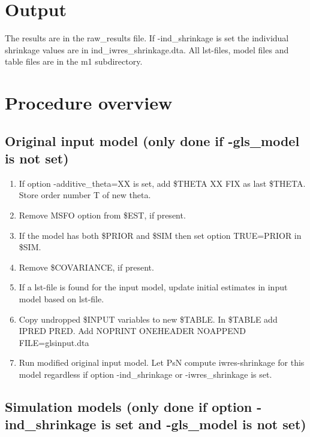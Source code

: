 \documentclass[a4paper,12pt]{article}
\begin{document}
\section{Output}

The results are in the raw\_results file. If -ind\_shrinkage is set the individual shrinkage values are in ind\_iwres\_shrinkage.dta. All lst-files, model files and table files are in the m1 subdirectory.

\section{Procedure overview}

\subsection{Original input model (only done if -gls\_model is not set)}

\begin{enumerate}
\item If option -additive\_theta=XX is set, add \$THETA XX FIX as last \$THETA. Store order number T of new theta.
\item Remove MSFO option from \$EST, if present.
\item If the model has both \$PRIOR and \$SIM then set option TRUE=PRIOR in \$SIM. 
\item Remove \$COVARIANCE, if present.
\item If a lst-file is found for the input model, update initial estimates in input model based on lst-file.
\item Copy undropped \$INPUT variables to new \$TABLE. In \$TABLE add IPRED PRED. Add NOPRINT ONEHEADER NOAPPEND FILE=glsinput.dta
\item Run modified original input model. Let PsN compute iwres-shrinkage for this model regardless if option -ind\_shrinkage or -iwres\_shrinkage is set.
\end{enumerate}

\subsection{Simulation models (only done if option -ind\_shrinkage is set and -gls\_model is not set)}
\end{document}
